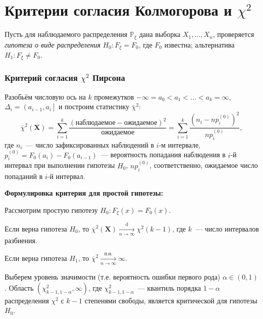 \section{Критерии согласия Колмогорова и \texorpdfstring{$\chi^{2}$}{хи-квадрат}}

Пусть для наблюдаемого распределения $\mathbb{P}_{\xi}$ дана выборка $X_1, \ldots, X_n$, 
проверяется \textit{гипотеза о виде распределения} $H_{0}\colon F_{\xi}=F_{0}$, где $F_{0}$ известна; 
альтернатива $H_{1}: F_{\xi} \neq F_{0}$.

\subsubsection{Критерий согласия $\chi^{2}$ Пирсона}
Разобьём числовую ось на $k$ промежутков ${-\infty=a_{0}<a_{1}<\ldots<a_{k}=\infty}$, ${\Delta_{i}=\left(a_{i-1}, a_{i}\right]}$ и построим статистику $\overline{\chi}^{2}$:
\begin{equation*}
    \overline{\chi}^{2}(\mathbf{X}) = 
    \sum\limits_{i=1}^{k} \frac{\left(\text{наблюдаемое} - \text{ожидаемое}\right)^{2}}{\text{ожидаемое}} = 
    \sum\limits_{i=1}^{k} \frac{\left(n_{i}-n p_{i}^{(0)}\right)^{2}}{n p_{i}^{(0)}},
\end{equation*}
где $n_i$~--- число зафиксированных наблюдений в $i$-м интервале,
${p_{i}^{(0)}=F_{0}\left(a_{i}\right)-F_{0}\left(a_{i-1}\right)}$~--- вероятность попадания наблюдения в $i$-й интервал при выполнении гипотезы $H_0$, 
$n p_{i}^{(0)}$, соответственно, ожидаемое число попаданий в $i$-й интервал.

\bigskip
\noindent \textbf{Формулировка критерия для простой гипотезы:}

Рассмотрим простую гипотезу $H_0\colon F_{\xi}(x) = F_0(x)$.
\begin{compactlist}
    \item Если верна гипотеза $H_0$, то $\overline{\chi}^{2}\left(\mathbf{X}\right) \xrightarrow[n \to \infty]{\text{d}} \chi^2(k-1)$, 
    где $k$~--- число интервалов разбиения.
    \item Если верна гипотеза $H_1$, то $\overline{\chi}^{2} \xrightarrow[n \to \infty]{\text{п.н.}} \infty$.
\end{compactlist}

Выберем уровень значимости (т.е. вероятность ошибки первого рода) $\alpha \in (0, 1)$. 
Область $(\chi^{2}_{k-1, 1 - \alpha}, \infty)$, где $\chi^{2}_{k-1, 1 - \alpha}$~--- квантиль порядка $1-\alpha$ распределения $\chi^{2}$ с $k-1$ степенями свободы, является критической для гипотезы $H_0$.

